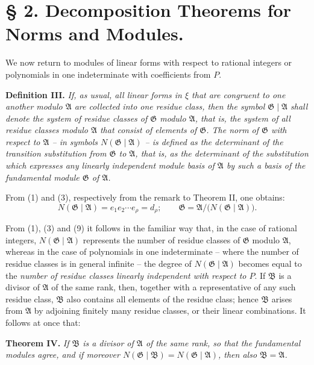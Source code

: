 \documentclass[11pt]{article}
\newcommand{\Amod}{\mathfrak A}
\newcommand{\Bmod}{\mathfrak B}
\newcommand{\Gmod}{\mathfrak G}
\newcommand{\Norm}{N}
\begin{document}
\section*{§ 2. Decomposition Theorems for Norms and Modules.}

We now return to modules of linear forms with respect to rational integers or polynomials in one indeterminate with coefficients from $P$.

\medskip
\noindent\textbf{Definition III.} \emph{If, as usual, all linear forms in $\xi$ that are congruent to one another modulo $\Amod$ are collected into one residue class, then the symbol $\Gmod\mid\Amod$ shall denote the system of residue classes of $\Gmod$ modulo $\Amod$, that is, the system of all residue classes modulo $\Amod$ that consist of elements of $\Gmod$. The norm of $\Gmod$ with respect to $\Amod$ -- in symbols $\Norm(\Gmod\mid\Amod)$ -- is defined as the determinant of the transition substitution from $\Gmod$ to $\Amod$, that is, as the determinant of the substitution which expresses any linearly independent module basis of $\Amod$ by such a basis of the fundamental module $\Gmod$ of $\Amod$.}

From (1) and (3), respectively from the remark to Theorem II, one obtains:
\begin{equation}
 \Norm(\Gmod\mid\Amod)=e_1e_2\cdots e_\rho=d_\rho;
 \qquad
 \Gmod=\Amod/\bigl(\Norm(\Gmod\mid\Amod)\bigr).
\tag{9}
\end{equation}

From (1), (3) and (9) it follows in the familiar way that, in the case of rational integers, $\Norm(\Gmod\mid\Amod)$ represents the number of residue classes of $\Gmod$ modulo $\Amod$, whereas in the case of polynomials in one indeterminate -- where the number of residue classes is in general infinite -- the degree of $\Norm(\Gmod\mid\Amod)$ becomes equal to the \emph{number of residue classes linearly independent with respect to $P$}. If $\Bmod$ is a divisor of $\Amod$ of the same rank, then, together with a representative of any such residue class, $\Bmod$ also contains all elements of the residue class; hence $\Bmod$ arises from $\Amod$ by adjoining finitely many residue classes, or their linear combinations. It follows at once that:

\medskip
\noindent\textbf{Theorem IV.} \emph{If $\Bmod$ is a divisor of $\Amod$ of the same rank, so that the fundamental modules agree, and if moreover $\Norm(\Gmod\mid\Bmod)=\Norm(\Gmod\mid\Amod)$, then also $\Bmod=\Amod$.}
\end{document}
